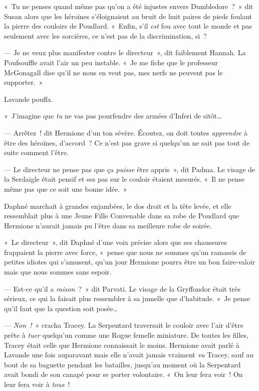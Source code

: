 «~Tu ne penses quand même pas qu'on a été injustes envers Dumbledore~?~» dit Susan alors que les héroïnes s'éloignaient au bruit de huit paires de pieds foulant la pierre des couloirs de Poudlard. «~Enfin, s'il \emph{est} fou avec tout le monde et pas seulement avec les sorcières, ce n'est pas de la discrimination, si~?

--- Je ne veux plus manifester contre le directeur~», dit faiblement Hannah. La Poufsouffle avait l'air un peu instable. «~Je me fiche que le professeur McGonagall dise qu'il ne nous en veut pas, mes nerfs ne peuvent pas le supporter.~»

Lavande pouffa.

«~J'imagine que \emph{tu} ne vas pas pourfendre des armées d'Inferi de sitôt…

--- Arrêtez~! dit Hermione d'un ton sévère. Écoutez, on doit toutes \emph{apprendre} à être des héroïnes, d'accord~? Ce n'est pas grave si quelqu'un ne sait pas tout de suite comment l'être.

--- Le directeur ne pense pas que ça \emph{puisse} être appris~», dit Padma. Le visage de la Serdaigle était pensif et ses pas sur le couloir étaient mesurés. «~Il ne pense même pas que ce soit une bonne idée.~»

Daphné marchait à grandes enjambées, le dos droit et la tête levée, et elle ressemblait plus à une Jeune Fille Convenable dans sa robe de Poudlard que Hermione n'aurait jamais pu l'être dans sa meilleure robe de soirée.

«~Le directeur~», dit Daphné d'une voix précise alors que ses chaussures frappaient la pierre avec force, «~pense que nous ne sommes qu'un ramassis de petites idiotes qui s'amusent, qu'un jour Hermione pourra être un bon faire-valoir mais que nous sommes sans espoir.

--- Est-ce qu'il a \emph{raison}~?~» dit Parvati. Le visage de la Gryffondor était très sérieux, ce qui la faisait plus ressembler à sa jumelle que d'habitude. «~Je pense qu'il faut que la question soit posée…

--- \emph{Non~!}~» cracha Tracey. La Serpentard traversait le couloir avec l'air d'être prête à \emph{tuer} quelqu'un comme une Rogue femelle miniature. De toutes les filles, Tracey était celle que Hermione connaissait le moins. Hermione avait parlé à Lavande une fois auparavant mais elle n'avait jamais vraiment \emph{vu} Tracey, sauf au bout de sa baguette pendant les batailles, jusqu'au moment où la Serpentard avait bondi de son canapé pour se porter volontaire. «~On leur fera voir~! On leur fera voir à \emph{tous}~!

